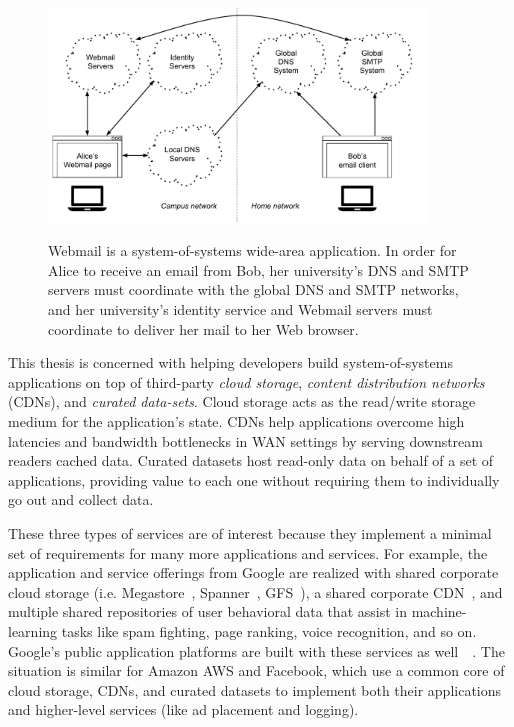 \begin{figure}[h]
   \caption{Webmail is a system-of-systems wide-area application.  In order for
   Alice to receive an email from Bob, her university's DNS and SMTP servers
   must coordinate with the global DNS and SMTP networks, and her university's
   identity service and Webmail servers must coordinate to deliver her mail to
   her Web browser.}
   \centering
   \includegraphics[width=0.9\textwidth,page=1]{figures/dissertation-figures}
   \label{fig:chap1-system-of-systems}
\end{figure}

This thesis is concerned with helping developers build
system-of-systems applications on top of third-party \emph{cloud storage},
\emph{content distribution networks} (CDNs), and \emph{curated data-sets}.
Cloud storage acts as the read/write storage medium for the
application's state.  CDNs help applications overcome high latencies and
bandwidth bottlenecks in WAN settings by serving downstream readers cached data.
Curated datasets host read-only data on behalf of a set of applications, providing value
to each one without requiring them to individually go out and
collect data.

These three types of services are of interest because they implement a
minimal set of requirements for many more applications and services.  For
example, the application and service offerings from Google are
realized with shared corporate cloud storage (i.e. Megastore~\cite{megastore},
Spanner~\cite{spanner}, GFS~\cite{gfs}), a shared corporate
CDN~\cite{google-cdn}, and multiple shared repositories of user behavioral data
that assist in machine-learning tasks like 
spam fighting, page ranking, voice recognition, and so on.  Google's public application
platforms are built with these services as
well~\cite{google-appengine}~\cite{google-cloud}.  The situation is similar for
Amazon AWS and Facebook, which use a common core of cloud storage, CDNs, and
curated datasets to implement both their applications and 
higher-level services (like ad placement and logging).

